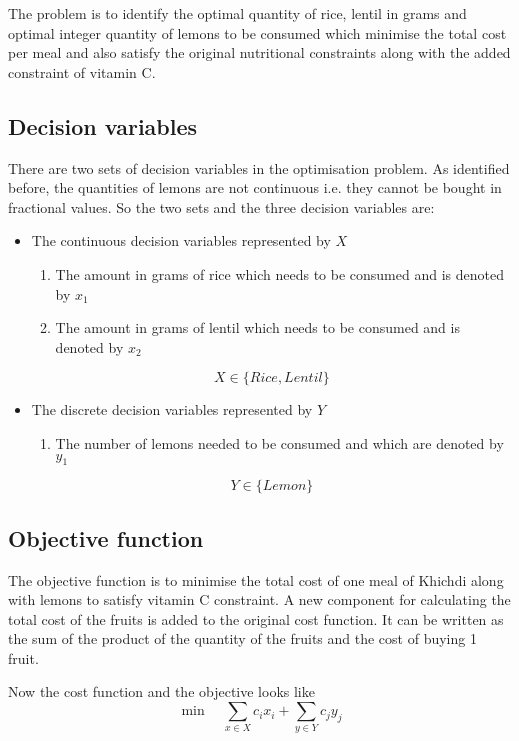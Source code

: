 \documentclass[
]{article}
\begin{document}
The problem is to identify the optimal quantity of rice, lentil in grams and optimal integer quantity of lemons to be consumed
which minimise the total cost per meal and also satisfy the original nutritional constraints along with the added constraint of vitamin C.

\hypertarget{decision-variables-1}{%
	\subsection{Decision variables}\label{decision-variables-1}}

There are two sets of decision variables in the optimisation problem. As identified before, the quantities of lemons are not continuous i.e. they cannot be bought in fractional values.
So the two sets and the three decision variables are:
\begin{itemize}
	\item The continuous decision variables represented by \(X\)
	      \begin{enumerate}
	      	\item The amount in grams of rice which needs to be consumed and is denoted by \(x_1\)
	      	\item The amount in grams of lentil which needs to be consumed and is denoted by \(x_2\)
	      \end{enumerate}
	      \[ X \in \{Rice, Lentil \}\]
	\item The discrete decision variables represented by \(Y\)
	      \begin{enumerate}
	      	\item The number of lemons needed to be consumed and which are denoted by \(y_1\)
	      \end{enumerate}
	      \[ Y \in \{Lemon\}\]
\end{itemize}


\hypertarget{objective-function-1}{%
	\subsection{Objective function}\label{objective-function-1}}

The objective function is to minimise the total cost of one meal of Khichdi along with lemons to satisfy vitamin C constraint.
A new component for calculating the total cost of the fruits is added to the original cost function.
It can be written as the sum of the product of the quantity of the fruits and the cost of buying 1 fruit.

Now the cost function and the objective looks like
\[ \min \quad \sum_{x\in X} c_ix_i + \sum_{y\in Y} c_jy_j \]
\end{document}
